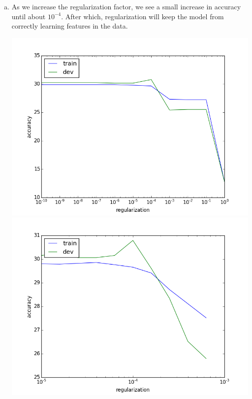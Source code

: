 \documentclass{article}
\begin{document}
\begin{enumerate}[(a)]
\item As we increase the regularization factor, we see a small increase in accuracy until about $10^{-4}$.  After which, regularization will keep the model from correctly learning features in the data.

\includegraphics[width=\textwidth]{q4_reg_v_acc_001}
\includegraphics[width=\textwidth]{q4_reg_v_acc}

\end{enumerate}
\end{document}
